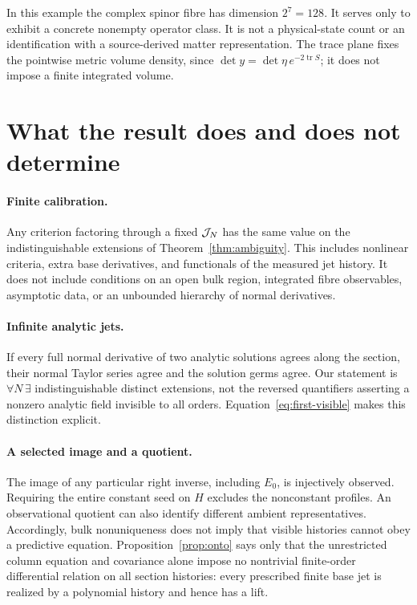 \documentclass[11pt]{article}
\theoremstyle{definition}\newtheorem{definition}[theorem]{Definition}
\theoremstyle{remark}\newtheorem{remark}[theorem]{Remark}
\DeclareMathOperator{\tr}{tr}
\begin{document}
In this example the complex spinor fibre has dimension $2^7=128$. It serves only to exhibit a concrete nonempty operator class. It is not a physical-state count or an identification with a source-derived matter representation. The trace plane fixes the pointwise metric volume density, since $\det y=\det\eta\,e^{-2\tr S}$; it does not impose a finite integrated volume.

\section{What the result does and does not determine}\label{sec:limits}
\paragraph{Finite calibration.}
Any criterion factoring through a fixed $\mathcal J_N$ has the same value on the indistinguishable extensions of Theorem~\ref{thm:ambiguity}. This includes nonlinear criteria, extra base derivatives, and functionals of the measured jet history. It does not include conditions on an open bulk region, integrated fibre observables, asymptotic data, or an unbounded hierarchy of normal derivatives.

\paragraph{Infinite analytic jets.}
If every full normal derivative of two analytic solutions agrees along the section, their normal Taylor series agree and the solution germs agree. Our statement is $\forall N\,\exists$ indistinguishable distinct extensions, not the reversed quantifiers asserting a nonzero analytic field invisible to all orders. Equation~\eqref{eq:first-visible} makes this distinction explicit.

\paragraph{A selected image and a quotient.}
The image of any particular right inverse, including $E_0$, is injectively observed. Requiring the entire constant seed on $H$ excludes the nonconstant profiles. An observational quotient can also identify different ambient representatives. Accordingly, bulk nonuniqueness does not imply that visible histories cannot obey a predictive equation. Proposition~\ref{prop:onto} says only that the unrestricted column equation and covariance alone impose no nontrivial finite-order differential relation on all section histories: every prescribed finite base jet is realized by a polynomial history and hence has a lift.
\end{document}
